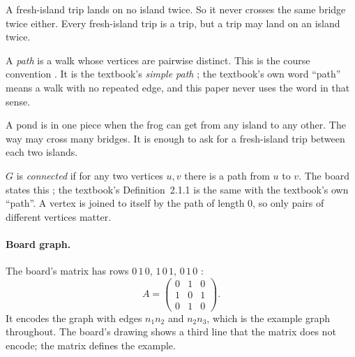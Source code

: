 \plainwords{} A fresh-island trip lands on no island twice. So it never crosses the same bridge twice either. Every fresh-island trip is a trip, but a trip may land on an island twice.

\begin{definition}[Path]\label{def:path}
A \emph{path} is a walk whose vertices are pairwise distinct. This is the
course convention \cite{userstatements}. It is the textbook's \emph{simple
path} \cite[Definition~1.2.13, p.~22]{petrosyan2015graphs}; the textbook's
own word ``path'' means a walk with no repeated edge, and this paper never
uses the word in that sense.
\end{definition}

\plainwords{} A pond is in one piece when the frog can get from any island to any other. The way may cross many bridges. It is enough to ask for a fresh-island trip between each two islands.

\begin{definition}[Connected]\label{def:connected}
$G$ is \emph{connected} if for any two vertices $u,v$ there is a path from
$u$ to $v$. The board states this
\cite{whiteboard1,whiteboard2}; the textbook's Definition~2.1.1
\cite[p.~48]{petrosyan2015graphs} is the same with the textbook's own ``path''. A vertex is joined to itself by the path
of length $0$, so only pairs of different vertices matter.
\end{definition}

\paragraph{Board graph.} The board's matrix has rows $0\,1\,0$, $1\,0\,1$,
$0\,1\,0$ \cite{whiteboard1,whiteboard2}:
\[
A=\begin{pmatrix}0&1&0\\1&0&1\\0&1&0\end{pmatrix}.
\]
It encodes the graph with edges $n_1n_2$ and $n_2n_3$, which is the example
graph throughout. The board's drawing shows a third line that the matrix
does not encode; the matrix defines the example.
